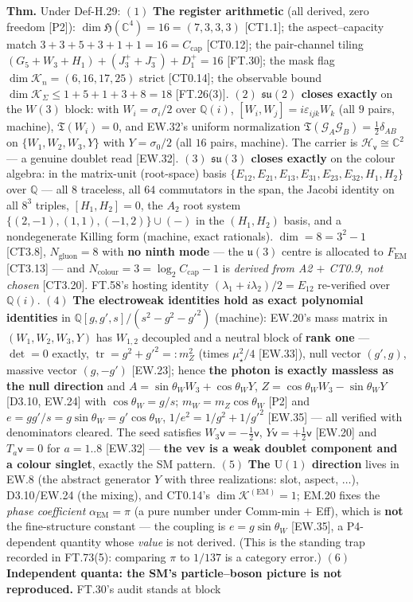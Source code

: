\begin{theorem}
\textbf{Thm.} Under Def-H.29: $(1)$ \textbf{The register arithmetic} (all derived, zero freedom [P2]): $\dim\mathfrak H(\mathbb C^4)=16=(7,3,3,3)$ [CT1.1]; the aspect–capacity match $3{+}3{+}5{+}3{+}1{+}1=16=C_{\mathrm{cap}}$ [CT0.12]; the pair-channel tiling $(G_5{+}W_3{+}H_1)+(J^+_3{+}J^-_3)+D^+_1=16$ [FT.30]; the mask flag $\dim\mathcal K_n=(6,16,17,25)$ strict [CT0.14]; the observable bound $\dim\mathcal K_\Sigma\le1{+}5{+}1{+}3{+}8=18$ [FT.26(3)]. $(2)$ \textbf{$\mathfrak{su}(2)$ closes exactly} on the $W(3)$ block: with $W_i=\sigma_i/2$ over $\mathbb Q(i)$, $[W_i,W_j]=i\varepsilon_{ijk}W_k$ (all $9$ pairs, machine), $\mathfrak T(W_i)=0$, and EW.32's uniform normalization $\mathfrak T(\mathcal G_A\mathcal G_B)=\tfrac12\delta_{AB}$ on $\{W_1,W_2,W_3,Y\}$ with $Y=\sigma_0/2$ (all $16$ pairs, machine). The carrier is $\mathcal H_{\mathsf v}\cong\mathbb C^2$ — a genuine doublet read [EW.32]. $(3)$ \textbf{$\mathfrak{su}(3)$ closes exactly} on the colour algebra: in the matrix-unit (root-space) basis $\{E_{12},E_{21},E_{13},E_{31},E_{23},E_{32},H_1,H_2\}$ over $\mathbb Q$ — all $8$ traceless, all $64$ commutators in the span, the Jacobi identity on all $8^3$ triples, $[H_1,H_2]=0$, the $A_2$ root system $\{(2,-1),(1,1),(-1,2)\}\cup(-)$ in the $(H_1,H_2)$ basis, and a nondegenerate Killing form (machine, exact rationals). $\dim=8=3^2{-}1$ [CT3.8], $N_{\mathrm{gluon}}=8$ with \textbf{no ninth mode} — the $\mathfrak u(3)$ centre is allocated to $F_{\mathrm{EM}}$ [CT3.13] — and $N_{\text{colour}}=3=\log_2C_{\mathrm{cap}}-1$ is \textit{derived from A2 $+$ CT0.9, not chosen} [CT3.20]. FT.58's hosting identity $(\lambda_1+i\lambda_2)/2=E_{12}$ re-verified over $\mathbb Q(i)$. $(4)$ \textbf{The electroweak identities hold as exact polynomial identities} in $\mathbb Q[g,g',s]/(s^2-g^2-g'^2)$ (machine): EW.20's mass matrix in $(W_1,W_2,W_3,Y)$ has $W_{1,2}$ decoupled and a neutral block of \textbf{rank one} — $\det=0$ exactly, $\operatorname{tr}=g^2+g'^2=:m_Z^2$ (times $\mu_\star^2/4$ [EW.33]), null vector $(g',g)$, massive vector $(g,-g')$ [EW.23]; hence \textbf{the photon is exactly massless as the null direction} and $A=\sin\theta_WW_3+\cos\theta_WY$, $Z=\cos\theta_WW_3-\sin\theta_WY$ [D3.10, EW.24] with $\cos\theta_W=g/s$; $m_W=m_Z\cos\theta_W$ [P2] and $e=gg'/s=g\sin\theta_W=g'\cos\theta_W$, $1/e^2=1/g^2+1/g'^2$ [EW.35] — all verified with denominators cleared. The seed satisfies $W_3\mathsf v=-\tfrac12\mathsf v$, $Y\mathsf v=+\tfrac12\mathsf v$ [EW.20] and $T_a\mathsf v=0$ for $a=1..8$ [EW.32] — \textbf{the vev is a weak doublet component and a colour singlet}, exactly the SM pattern. $(5)$ \textbf{The $\mathrm U(1)$ direction} lives in EW.8 (the abstract generator $Y$ with three realizations: slot, aspect, $\dots$), D3.10/EW.24 (the mixing), and CT0.14's $\dim\mathcal K^{(\mathrm{EM})}=1$; EM.20 fixes the \textit{phase coefficient} $\alpha_{\mathrm{EM}}=\pi$ (a pure number under Comm-min $+$ Eff), which is \textbf{not} the fine-structure constant — the coupling is $e=g\sin\theta_W$ [EW.35], a P4-dependent quantity whose \textit{value} is not derived. (This is the standing trap recorded in FT.73(5): comparing $\pi$ to $1/137$ is a category error.) $(6)$ \textbf{Independent quanta: the SM's particle–boson picture is not reproduced.} FT.30's audit stands at block 
\end{theorem}
